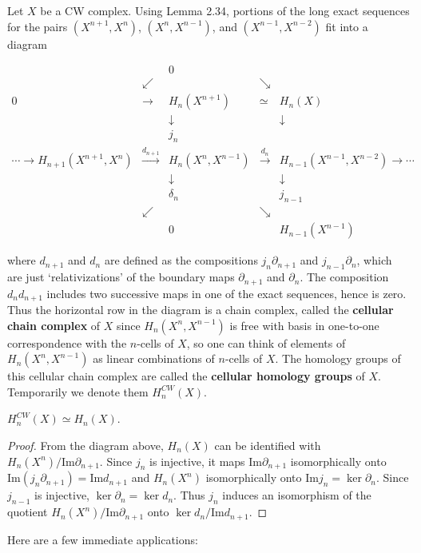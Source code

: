 Let $X$ be a CW complex. Using Lemma 2.34, portions of the long exact sequences for the pairs $(X^{n+1}, X^n)$, $(X^n, X^{n-1})$, and $(X^{n-1}, X^{n-2})$ fit into a diagram

\[
\begin{array}{ccccc}
& & 0 & & \\
& \swarrow & & \searrow & \\
0 & \to & H_n(X^{n+1}) & \simeq & H_n(X) \\
& & \downarrow & & \downarrow \\
& & j_n & & \\
\cdots \to H_{n+1}(X^{n+1}, X^n) & \xrightarrow{d_{n+1}} & H_n(X^n, X^{n-1}) & \xrightarrow{d_n} & H_{n-1}(X^{n-1}, X^{n-2}) \to \cdots \\
& & \downarrow & & \downarrow \\
& & \delta_n & & j_{n-1} \\
& \swarrow & & \searrow & \\
& & 0 & & H_{n-1}(X^{n-1})
\end{array}
\]

where $d_{n+1}$ and $d_n$ are defined as the compositions $j_n \partial_{n+1}$ and $j_{n-1} \partial_n$, which are just `relativizations' of the boundary maps $\partial_{n+1}$ and $\partial_n$. The composition $d_n d_{n+1}$ includes two successive maps in one of the exact sequences, hence is zero. Thus the horizontal row in the diagram is a chain complex, called the \textbf{cellular chain complex} of $X$ since $H_n(X^n, X^{n-1})$ is free with basis in one-to-one correspondence with the $n$-cells of $X$, so one can think of elements of $H_n(X^n, X^{n-1})$ as linear combinations of $n$-cells of $X$. The homology groups of this cellular chain complex are called the \textbf{cellular homology groups} of $X$. Temporarily we denote them $H_n^{CW}(X)$.

\begin{theorem}
\label{thm:cellular-singular-homology-isomorphic}
$H_n^{CW}(X) \simeq H_n(X)$.
\end{theorem}

\begin{proof}
 From the diagram above, $H_n(X)$ can be identified with $H_n(X^n)/\text{Im}\partial_{n+1}$. Since $j_n$ is injective, it maps $\text{Im}\partial_{n+1}$ isomorphically onto $\text{Im}(j_n\partial_{n+1}) = \text{Im}d_{n+1}$ and $H_n(X^n)$ isomorphically onto $\text{Im}j_n = \ker\partial_n$. Since $j_{n-1}$ is injective, $\ker\partial_n = \ker d_n$. Thus $j_n$ induces an isomorphism of the quotient $H_n(X^n)/\text{Im}\partial_{n+1}$ onto $\ker d_n/\text{Im}d_{n+1}$.
\end{proof}
Here are a few immediate applications:

